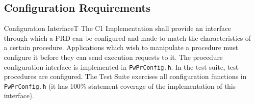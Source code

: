 \documentclass[a4paper,10pt]{article}
\newenvironment{fw_req}[6]
{\addtocounter{subsubsection}{1}
	\hspace{0.2cm}\textbf{FW-\arabic{section}.\arabic{subsection}.\arabic{subsubsection}/#2
	\hspace{0.8cm} #1}
	\vspace{-10pt}
\begin{longtable}{p{2.7cm}P{8.5cm}}
\hline
\textsc{Requirement} & #3 \\
\textsc{Justification} & #4 \\
\textsc{Implementation} & #5  \\ 
\textsc{Verification} & #6  \\
\hline
}
{\end{longtable}}
\begin{document}
\subsection{Configuration Requirements}\label{req:configInterfacePRD}

\begin{fw_req}{Configuration Interface}{T}
{The C1 Implementation shall provide an interface through which a PRD can 
be configured and made to match the characteristics of a certain procedure.}
{Applications which wish to manipulate a procedure must configure it 
before they can send execution requests to it.}
{The procedure configuration interface is implemented in 
\texttt{FwPrConfig.h}.} 
{In the test suite, test procedures are configured. 
The Test Suite exercises all configuration functions in \texttt{FwPrConfig.h} 
(it has 100\% statement coverage of the implementation of this interface).}
\end{fw_req}
\end{document}
